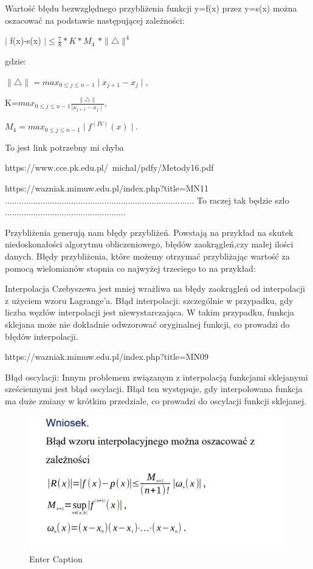 \documentclass{article}
\begin{document}
Wartość błędu bezwzględnego przybliżenia funkcji y=f(x) przez y=s(x) można
oszacować na podstawie następującej zależności:

$\mid$ f(x)-s(x) $\mid \leq \frac{7}{8} \ast {K} \ast$$ M_4$ $\ast \parallel \bigtriangleup \parallel^4$

gdzie:

$\parallel \bigtriangleup \parallel=max_{0\leq j \leq n-1}\mid x_{j+1}-x_{j}\mid$,

K=$max_{0\leq j \leq n-1} \frac{\parallel \bigtriangleup \parallel}{\mid x_{j+1}-x_j \mid }$,

$M_4=max_{0\leq j \leq n-1}\mid f^{(IV)}(x)\mid$.

 To jest link potrzebny mi chyba
 


https://www.cce.pk.edu.pl/~michal/pdfy/Metody16.pdf

https://wazniak.mimuw.edu.pl/index.php?title=MN11
................................................................................   To raczej tak będzie szło ...................................................

Przybliżenia generują nam błędy przybliżeń. Powstają na przykład na skutek niedoskonałości algorytmu obliczeniowego, błędów zaokrągleń,czy małej ilości danych.
Błędy przybliżenia, które możemy otrzymać przybliżając wartość za pomocą wielomianów stopnia co najwyżej trzeciego to na przykład:

Interpolacja Czebyszewa jest mniej wrażliwa na błędy zaokrągleń od
interpolacji z użyciem wzoru Lagrange'a.
Błąd interpolacji: szczególnie w przypadku, gdy liczba węzłów interpolacji jest niewystarczająca. W takim przypadku, funkcja sklejana może nie dokładnie odwzorować oryginalnej funkcji, co prowadzi do błędów interpolacji.

https://wazniak.mimuw.edu.pl/index.php?title=MN09

Błąd oscylacji: Innym problemem związanym z interpolacją funkcjami sklejanymi sześciennymi jest błąd oscylacji. Błąd ten występuje, gdy interpolowana funkcja ma duże zmiany w krótkim przedziale, co prowadzi do oscylacji funkcji sklejanej.
\begin{figure}
    \centering
    \includegraphics[width=0.5\linewidth]{assets/image.png}
    \caption{Enter Caption}
    \label{fig:enter-label}
\end{figure}
\end{document}
